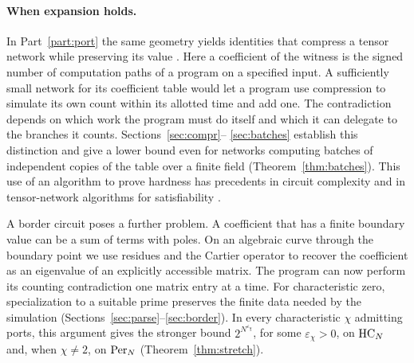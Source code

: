 \paragraph{When expansion holds.}
In Part~\ref{part:port} the same geometry yields identities that
compress a tensor network while preserving its value \cite{oaG}.
Here a coefficient of the witness is the signed number of computation
paths of a program on a specified input. A sufficiently small network
for its coefficient table would let a program use compression to
simulate its own count within its allotted time and add one. The
contradiction depends on which work the program must do itself and which
it can delegate to the branches it counts. Sections~\ref{sec:compr}--%
\ref{sec:batches} establish this distinction and give a lower bound
even for networks computing batches of independent copies of the table
over a finite field (Theorem~\ref{thm:batches}). This use of an
algorithm to prove hardness has precedents in circuit complexity
\cite{ki,williams} and in tensor-network algorithms for satisfiability
\cite{falseeth,Anthropic}.

A border circuit poses a further problem. A coefficient that has a
finite boundary value can be a sum of terms with poles. On an algebraic
curve through the boundary point we use residues and the Cartier
operator to recover the coefficient as an eigenvalue of an explicitly
accessible matrix. The program can now perform its counting
contradiction one matrix entry at a time. For characteristic zero,
specialization to a suitable prime preserves the finite data needed by
the simulation (Sections~\ref{sec:parse}--\ref{sec:border}).
In every characteristic $\chi$ admitting ports, this argument gives
the stronger bound $2^{N^{\varepsilon_\chi}}$, for some
$\varepsilon_\chi>0$, on $\mathrm{HC}_N$ and, when $\chi\ne2$, on $\mathrm{Per}_N$
(Theorem~\ref{thm:stretch}).
